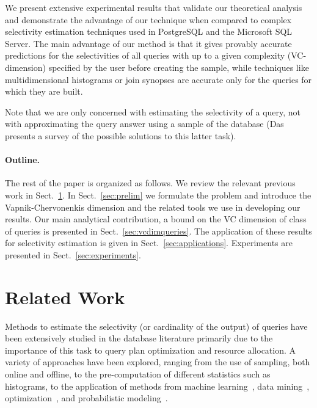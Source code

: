 We present extensive experimental results that validate our theoretical analysis
and demonstrate the advantage of our technique when compared to complex
selectivity estimation techniques used in PostgreSQL and the Microsoft SQL
Server. The main advantage of our method is that it gives provably accurate
predictions for the selectivities of all queries with up to a given complexity
(VC-dimension) specified by the user before creating the sample, while
techniques like multidimensional histograms or join synopses are accurate only
for the queries for which they are built.

Note that we are only concerned with estimating the selectivity of a query, not
with approximating the query answer using a sample of the database
(Das~\citeyearpar{Das09} presents a survey of the possible solutions to this latter
task). %

\paragraph{Outline.} The rest of the paper is organized as follows. We review
the relevant previous work in Sect.~\ref{sec:prevwork}. In
Sect.~\ref{sec:prelim} we formulate the problem and introduce the
Vapnik-Chervonenkis dimension and the related tools we use in developing our
results. Our main analytical contribution, a bound on the VC dimension  of class of queries is presented in Sect.~\ref{sec:vcdimqueries}.  The application of these results for selectivity estimation is
given in Sect.~\ref{sec:applications}. Experiments are presented in
Sect.~\ref{sec:experiments}. 

\section{Related Work}\label{sec:prevwork}
Methods to estimate the selectivity (or cardinality of the output) of queries
have been extensively studied in the database literature primarily due to the
importance of this task  to query plan optimization and resource allocation. A
variety of approaches have been explored, ranging from the use of sampling, both
online and offline, to the pre-computation of different statistics such as
histograms, to the application of methods from machine
learning~\citep{ChenMM90,HarangsriNS97}, data mining~\citep{GryzL04},
optimization~\citep{ChaudhuriDN07,MarklHKMST07}, and probabilistic
modeling~\citep{GetoorTK01,ReS10}.

